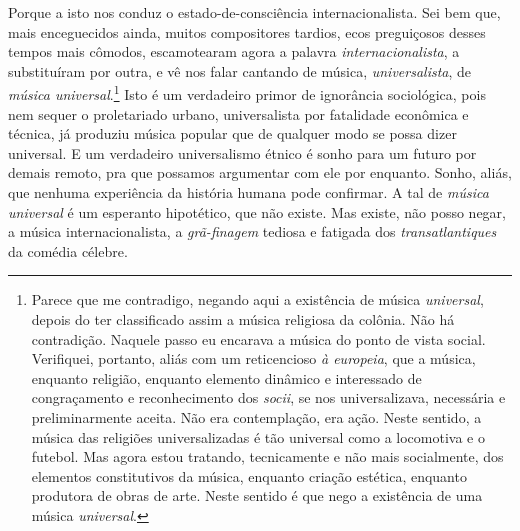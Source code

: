 Porque a isto nos conduz o estado-de-consciência internacionalista. Sei
bem que, mais enceguecidos ainda, muitos compositores tardios, ecos
preguiçosos desses tempos mais cômodos, escamotearam agora a palavra
\textit{internacionalista}, a substituíram por outra, e vê nos falar cantando
de música, \textit{universalista}, de \textit{música universal}.\footnote{Parece que me contradigo, negando aqui a existência de música
\textit{universal}, depois do ter classificado assim a música religiosa da
colônia. Não há contradição. Naquele passo eu encarava a música do ponto
de vista social. Verifiquei, portanto, aliás com um reticencioso \textit{à
europeia}, que a música, enquanto religião, enquanto elemento dinâmico
e interessado de congraçamento e reconhecimento dos \textit{socii}, se nos
universalizava, necessária e preliminarmente aceita. Não era
contemplação, era ação. Neste sentido, a música das religiões
universalizadas é tão universal como a locomotiva e o futebol. Mas agora
estou tratando, tecnicamente e não mais socialmente, dos elementos
constitutivos da música, enquanto criação estética, enquanto produtora
de obras de arte. Neste sentido é que nego a existência de uma música
\textit{universal}.} Isto é um
verdadeiro primor de ignorância sociológica, pois nem sequer o
proletariado urbano, universalista por fatalidade econômica e técnica,
já produziu música popular que de qualquer modo se possa dizer
universal. E um verdadeiro universalismo étnico é sonho para um futuro
por demais remoto, pra que possamos argumentar com ele por enquanto.
Sonho, aliás, que nenhuma experiência da história humana pode confirmar.
A tal de \textit{música universal} é um esperanto hipotético, que não existe.
Mas existe, não posso negar, a música internacionalista, a \textit{grã-finagem}
tediosa e fatigada dos \textit{transatlantiques} da comédia célebre.


